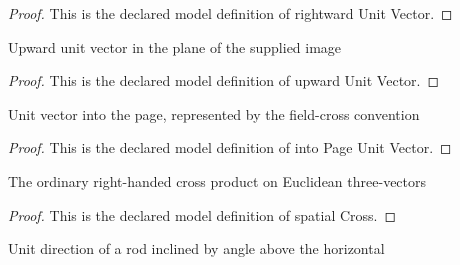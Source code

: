\begin{proof}
  This is the declared model definition of rightward Unit Vector.
\end{proof}
\begin{definition}
  \label{def:physics:phyx-mini-0953:phyxminiproblems-problemphyxmini0953-upwardunitvector}
  Upward unit vector in the plane of the supplied image
\end{definition}
\begin{proof}
  This is the declared model definition of upward Unit Vector.
\end{proof}
\begin{definition}
  \label{def:physics:phyx-mini-0953:phyxminiproblems-problemphyxmini0953-intopageunitvector}
  Unit vector into the page, represented by the field-cross convention
\end{definition}
\begin{proof}
  This is the declared model definition of into Page Unit Vector.
\end{proof}
\begin{definition}
  \label{def:physics:phyx-mini-0953:phyxminiproblems-problemphyxmini0953-spatialcross}
  The ordinary right-handed cross product on Euclidean three-vectors
\end{definition}
\begin{proof}
  This is the declared model definition of spatial Cross.
\end{proof}
\begin{definition}
  \label{def:physics:phyx-mini-0953:phyxminiproblems-problemphyxmini0953-roddirectionabovehorizontal}
  Unit direction of a rod inclined by angle above the horizontal
\end{definition}
